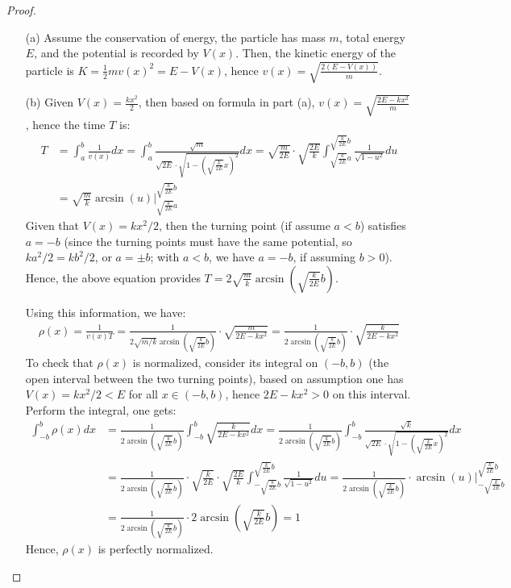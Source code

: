 \documentclass{article}
\begin{document}
\begin{proof}
    \hfill

    \begin{itemize}
        \item[(a)] Assume the conservation of energy, the particle has mass $m$, total energy $E$, and the potential is recorded by $V(x)$. Then, the kinetic energy of the particle is $K=\frac{1}{2}mv(x)^2=E-V(x)$, hence $v(x)=\sqrt{\frac{2(E-V(x))}{m}}$.
        \item[(b)] Given $V(x)=\frac{kx^2}{2}$,  then based on formula in part (a), $v(x)=\sqrt{\frac{2E-kx^2}{m}}$, hence the time $T$ is:
        \begin{align}
            T&=\int_{a}^{b}\frac{1}{v(x)}dx = \int_{a}^{b}\frac{\sqrt{m}}{\sqrt{2E}\cdot \sqrt{1-\left(\sqrt{\frac{k}{2E}}x\right)^2}}dx = \sqrt{\frac{m}{2E}}\cdot\sqrt{\frac{2E}{k}}\int_{\sqrt{\frac{k}{2E}}a}^{\sqrt{\frac{k}{2E}}b}\frac{1}{\sqrt{1-u^2}}du\\
            &= \sqrt{\frac{m}{k}}\arcsin(u)\bigg|_{\sqrt{\frac{k}{2E}}a}^{\sqrt{\frac{k}{2E}}b}
        \end{align}
        Given that $V(x)=kx^2/2$, then the turning point (if assume $a<b$) satisfies $a=-b$ (since the turning points must have the same potential, so $ka^2/2=kb^2/2$, or $a=\pm b$; with $a<b$, we have $a=-b$, if assuming $b>0$). Hence, the above equation provides $T=2\sqrt{\frac{m}{k}}\arcsin\left(\sqrt{\frac{k}{2E}}b\right)$.

        Using this information, we have: 
        \begin{align}
            \rho(x)=\frac{1}{v(x)T} = \frac{1}{2\sqrt{m/k}\arcsin\left(\sqrt{\frac{k}{2E}}b\right)}\cdot\sqrt{\frac{m}{2E-kx^2}} = \frac{1}{2\arcsin\left(\sqrt{\frac{k}{2E}}b\right)}\cdot\sqrt{\frac{k}{2E-kx^2}}
        \end{align}
        To check that $\rho(x)$ is normalized, consider its integral on $(-b,b)$ (the open interval between the two turning points), based on assumption one has $V(x)=kx^2/2< E$ for all $x \in (-b,b)$, hence  $2E-kx^2> 0$ on this interval. Perform the integral, one gets:
        \begin{align}
            \int_{-b}^{b}\rho(x)dx &= \frac{1}{2\arcsin\left(\sqrt{\frac{k}{2E}}b\right)}\int_{-b}^{b}\sqrt{\frac{k}{2E-kx^2}}dx=\frac{1}{2\arcsin\left(\sqrt{\frac{k}{2E}}b\right)}\int_{-b}^{b}\frac{\sqrt{k}}{\sqrt{2E}\cdot\sqrt{1-\left(\sqrt{\frac{k}{2E}}x\right)^2}}dx\\
            &= \frac{1}{2\arcsin\left(\sqrt{\frac{k}{2E}}b\right)}\cdot\sqrt{\frac{k}{2E}}\cdot \sqrt{\frac{2E}{k}}\int_{-\sqrt{\frac{k}{2E}}b}^{\sqrt{\frac{k}{2E}}b}\frac{1}{\sqrt{1-u^2}}du = \frac{1}{2\arcsin\left(\sqrt{\frac{k}{2E}}b\right)}\cdot\arcsin(u)\bigg|_{-\sqrt{\frac{k}{2E}}b}^{\sqrt{\frac{k}{2E}}b}\\
            &= \frac{1}{2\arcsin\left(\sqrt{\frac{k}{2E}}b\right)}\cdot 2\arcsin\left(\sqrt{\frac{k}{2E}}b\right)=1
        \end{align}
        Hence, $\rho(x)$ is perfectly normalized.


\end{itemize}
\end{proof}
\end{document}
